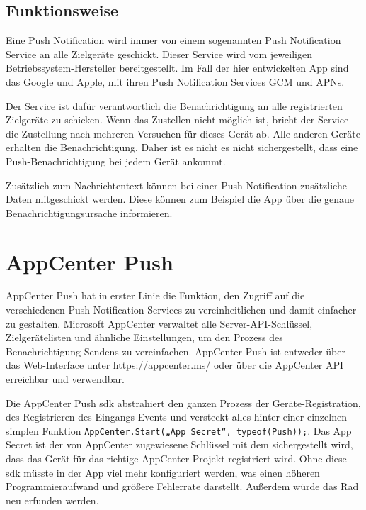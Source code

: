 \subsection{Funktionsweise}
Eine Push Notification wird immer von einem sogenannten Push Notification Service an alle Zielgeräte geschickt.
Dieser Service wird vom jeweiligen Betriebssystem-Hersteller bereitgestellt.
Im Fall der hier entwickelten App sind das Google und Apple, mit ihren Push Notification Services GCM und APNs.\par

Der Service ist dafür verantwortlich die Benachrichtigung an alle registrierten Zielgeräte zu schicken.
Wenn das Zustellen nicht möglich ist, bricht der Service die Zustellung nach mehreren Versuchen für dieses Gerät ab.
Alle anderen Geräte erhalten die Benachrichtigung.
Daher ist es nicht es nicht sichergestellt, dass eine Push-Benachrichtigung bei jedem Gerät ankommt.\par

Zusätzlich zum Nachrichtentext können bei einer Push Notification zusätzliche Daten mitgeschickt werden. Diese können zum Beispiel die App über die genaue Benachrichtigungsursache informieren.

\section{AppCenter Push}
AppCenter Push hat in erster Linie die Funktion, den Zugriff auf die verschiedenen Push Notification Services zu vereinheitlichen und damit einfacher zu gestalten.
Microsoft AppCenter verwaltet alle Server-API-Schlüssel, Zielgerätelisten und ähnliche Einstellungen, um den Prozess des Benachrichtigung-Sendens zu vereinfachen.
AppCenter Push ist entweder über das Web-Interface unter \url{https://appcenter.ms/} oder über die AppCenter API erreichbar und verwendbar.\par

Die AppCenter Push \acs{sdk} abstrahiert den ganzen Prozess der Geräte-Registration, des Registrieren des Eingangs-Events und versteckt alles hinter einer einzelnen simplen Funktion \texttt{AppCenter.Start(„{App Secret}“, typeof(Push));}. Das App Secret ist der von AppCenter zugewiesene Schlüssel mit dem sichergestellt wird, dass das Gerät für das richtige AppCenter Projekt registriert wird.
Ohne diese \acs{sdk} müsste in der App viel mehr konfiguriert werden, was einen höheren Programmieraufwand und größere Fehlerrate darstellt. Außerdem würde das Rad neu erfunden werden.\par

